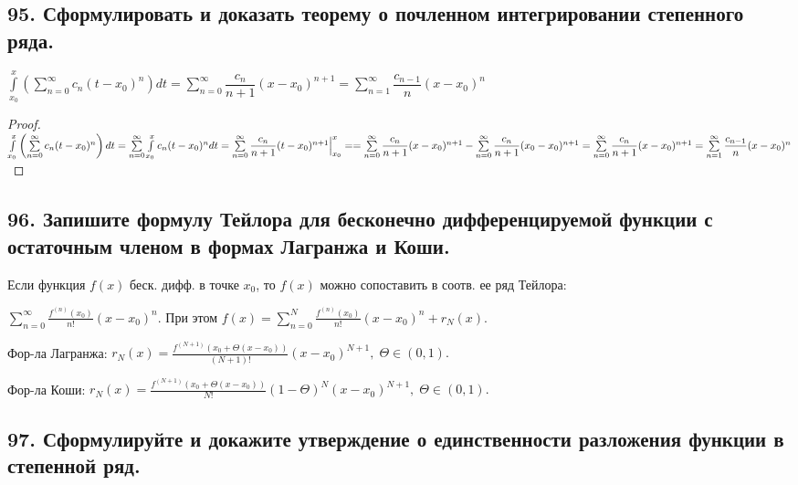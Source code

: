 \documentclass[a4paper, fleqn]{article}
\begin{document}
    \subsection*{95. Сформулировать и доказать теорему о почленном интегрировании степенного ряда.}
	$\int\limits_{x_0}^x \left( \sum\limits_{n = 0}^{\infty} c_n(t - x_0)^n \right) dt = 
	\sum\limits_{n = 0}^{\infty} \dfrac{c_n}{n + 1}(x - x_0)^{n + 1} = 
	\sum\limits_{n = 1}^{\infty} \dfrac{c_{n - 1}}n (x - x_0)^n$
	\begin{proof}
	$\int\limits_{x_0}^x \left( \sum\limits_{n = 0}^{\infty} c_n(t - x_0)^n \right) dt = 
	\sum\limits_{n = 0}^{\infty} \int\limits_{x_0}^x c_n(t - x_0)^n dt = 
	\sum\limits_{n = 0}^{\infty} \dfrac{c_n}{n + 1}(t - x_0)^{n + 1}\Big|_{x_0}^x = \\[3 pt]
	= \sum\limits_{n = 0}^{\infty} \dfrac{c_n}{n + 1}(x - x_0)^{n + 1} - 
	\sum\limits_{n = 0}^{\infty} \dfrac{c_n}{n + 1}(x_0 - x_0)^{n + 1} = 
	\sum\limits_{n = 0}^{\infty} \dfrac{c_n}{n + 1}(x - x_0)^{n + 1} = \sum\limits_{n = 1}^{\infty} \dfrac{c_{n - 1}}n (x - x_0)^n$
	\end{proof}    
    
    \subsection*{96. Запишите формулу Тейлора для бесконечно дифференцируемой функции с остаточным членом в формах Лагранжа и Коши.}
    
    Если функция $f(x)$ беск. дифф. в точке $x_0$, то $f(x)$ можно сопоставить в соотв. ее ряд Тейлора:
    
    $\displaystyle \sum_{n = 0}^{\infty} \frac{f^{(n)} (x_0)}{n!} (x - x_0)^n.$ При этом $f(x) = \displaystyle \sum_{n = 0}^{N} \frac{f^{(n)} (x_0)}{n!} (x - x_0)^n + r_N (x).$
    
    Фор-ла Лагранжа: $r_N(x) = \frac{ f^{(N + 1)} (x_0 + \Theta(x - x_0))}{(N + 1)!} (x - x_0)^{N + 1}, \; \Theta \in (0, 1). $
    
    Фор-ла Коши: $r_N(x) = \frac{f^{(N + 1)} (x_0 + \Theta(x - x_0))}{N!} (1 - \Theta)^N (x - x_0)^{N + 1}, \; \Theta \in (0, 1).$
        
        
    
    \subsection*{97. Сформулируйте и докажите утверждение о единственности разложения функции в степенной ряд.}
    
\end{document}

